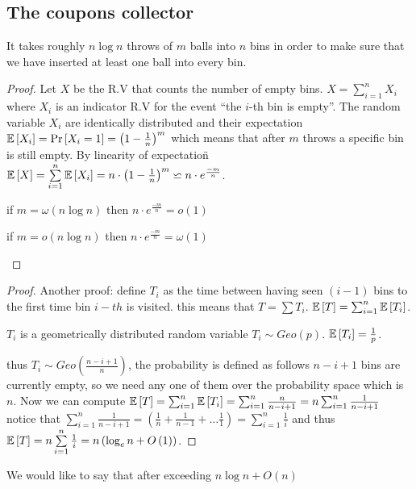 \subsection{The coupons collector}
\begin{claim}
It takes roughly $n\log n$ throws of $m$ balls into $n$ bins in
order to make sure that we have inserted at least one ball into every
bin. 
\end{claim}

\begin{proof}
Let $X$ be the R.V that counts the number of empty bins. $X=\sum\limits _{i=1}^{n}X_{i}$
where $X_{i}$ is an indicator R.V for the event ``the $i$-th bin
is empty''. The random variable $X_{i}$ are identically distributed
and their expectation $\mathbb{E}\left[X_{i}\right]=\Pr\left[X_{i}=1\right]=\left(1-\frac{1}{n}\right)^{m}$
which means that after $m$ throws a specific bin is still empty.
By linearity of expectation\"{ }$\mathbb{E}\left[X\right]=\sum\limits _{i=1}^{n}\mathbb{E}\left[X_{i}\right]=n\cdot\left(1-\frac{1}{n}\right)^{m}\backsimeq n\cdot e^{\frac{-m}{n}}$. 
\begin{casenv}
\item if $m=\omega\left(n\log n\right)$ then $n\cdot e^{\frac{-m}{n}}=o\left(1\right)$
\item if $m=o\left(n\log n\right)$ then $n\cdot e^{\frac{-m}{n}}=\omega\left(1\right)$ 
\end{casenv}
\end{proof}
%
\begin{proof}
Another proof: define $T_{i}$ as the time between having seen $\left(i-1\right)$
bins to the first time bin $i-th$ is visited. this means that $T=\sum T_{i}$.
$\mathbb{E}\left[T\right]=\sum_{i=1}^{n}\mathbb{E}\left[T_{i}\right]$. 
\begin{remark}
$T_{i}$ is a geometrically distributed random variable $T_{i}\sim Geo\left(p\right)$.
$\mathbb{E}\left[T_{i}\right]=\frac{1}{p}$.
\end{remark}

thus $T_{i}\sim Geo\left(\frac{n-i+1}{n}\right)$, the probability
is defined as follows $n-i+1$ bins are currently empty, so we need
any one of them over the probability space which is $n$. Now we can
compute $\mathbb{E}\left[T\right]=\sum_{i=1}^{n}\mathbb{E}\left[T_{i}\right]=\sum_{i=1}^{n}\frac{n}{n-i+1}=n\sum_{i=1}^{n}\frac{1}{n-i+1}$
notice that $\sum_{i=1}^{n}\frac{1}{n-i+1}=\left(\frac{1}{n}+\frac{1}{n-1}+\dots\frac{1}{1}\right)=\sum\limits _{i=1}^{n}\frac{1}{i}$
and thus $\mathbb{E}\left[T\right]=n\sum\limits _{i=1}^{n}\frac{1}{i}=n\left(\log_{e}n+O\left(1\right)\right)$. 
\end{proof}
We would like to say that after exceeding $n\log n+O\left(n\right)$
